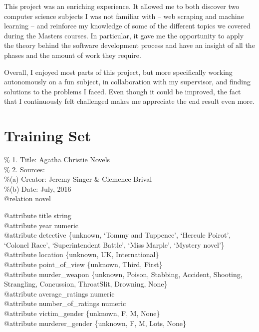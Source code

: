 \documentclass{mproj}
\begin{document}
This project was an enriching experience. It allowed me to both discover two computer science subjects I was not familiar with -- web scraping and machine learning -- and reinforce my knowledge of some of the different topics we covered during the Masters courses. In particular, it gave me the opportunity to apply the theory behind the software development process and have an insight of all the phases and the amount of work they require.

Overall, I enjoyed most parts of this project, but more specifically working autonomously on a fun subject, in collaboration with my supervisor, and finding solutions to the problems I faced. Even though it could be improved, the fact that I continuously felt challenged makes me appreciate the end result even more.





\appendix

\chapter{Training Set}\label{dataset}

\% 1. Title: Agatha Christie Novels\\
\% 2. Sources:\\
\%\hspace{5mm}(a) Creator: Jeremy Singer \& Clemence Brival\\
\%\hspace{5mm}(b) Date: July, 2016\\
@relation novel

@attribute title string\\
@attribute year numeric\\
@attribute detective \{unknown, `Tommy and Tuppence', `Hercule Poirot', `Colonel Race', `Superintendent Battle', `Miss Marple', `Mystery novel'\}\\
@attribute location \{unknown, UK, International\}\\
@attribute point\_of\_view \{unknown, Third, First\}\\
@attribute murder\_weapon \{unknown, Poison, Stabbing, Accident, Shooting, Strangling, Concussion, ThroatSlit, Drowning, None\}\\
@attribute average\_ratings numeric\\
@attribute number\_of\_ratings numeric\\
@attribute victim\_gender \{unknown, F, M, None\}\\
@attribute murderer\_gender \{unknown, F, M, Lots, None\}
\end{document}
